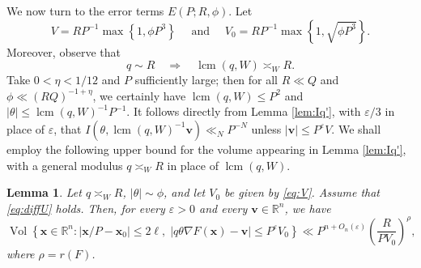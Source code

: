 \documentclass[a4paper,11pt, twoside,reqno]{amsart}
\theoremstyle{plain}
\newtheorem{lemma}[thm]{Lemma}
\theoremstyle{definition}
\theoremstyle{remark}
\newcommand{\bfv}{\bm{v}}
\newcommand{\bfx}{\bm{x}}
\newcommand{\RR}{\mathbb{R}}
\DeclareMathOperator{\meas}{Vol}
\newcommand{\ve}{\varepsilon}
\renewcommand{\le}{\leqslant}
\renewcommand{\leq}{\leqslant}
\newcommand{\lcm}{\operatorname{lcm}}
\numberwithin{equation}{section}
\begin{document}
We now turn to the error terms $E(P;R,\phi)$.
Let
\begin{equation}  
  \label{eq:V}
  V=RP^{-1} \max\left\{1,\phi P^3\right\}\quad \text{ and }\quad 
  V_0=RP^{-1} \max\left\{1,\sqrt{\phi P^3}\right\}.
  \end{equation}
  Moreover, observe that
$$q\sim R \quad \Longrightarrow \quad \lcm(q,W) \asymp_W R.$$
Take $0<\eta<1/12$ and $P$ sufficiently large; then
for all $R\ll Q$ and $\phi \ll (RQ)^{-1+\eta}$,
we certainly have $\lcm(q,W)\le P^2$ and $|\theta|\le \lcm(q,W)^{-1}P^{-1}$.
It follows directly from
Lemma \ref{lem:Iq'}, with $\ve/3$ in place of $\ve$, that 
$I(\theta,\lcm(q,W)^{-1}\bm{v})\ll_N P^{-N}$ unless 
$
|\bm{v}|\leq P^\ve V.
$
We shall employ the following upper bound for the volume appearing in 
Lemma \ref{lem:Iq'},
with a general modulus $q\asymp_W R$ in place of $\lcm(q,W)$.

\begin{lemma}\label{lem:gradient-volume}
Let $q\asymp_W R$, $|\theta|\sim \phi$, and let $V_0$ be given by \eqref{eq:V}.
Assume that \eqref{eq:diffU} holds.
Then, for every $\varepsilon>0$ and every
$\bfv\in \RR^n$, we have
\[
\meas\left\{
\bfx\in\RR^n:
|\bfx/P-\bm{x}_0|\le 2\ell,\;
|q\theta\nabla F(\bm{x})-\bm{v}|\leq P^\varepsilon V_0
\right\}
\ll
P^{n+O_n(\varepsilon)}\left(\frac{R}{PV_0}\right)^{\rho},
\]
where $\rho=r(F)$.
\end{lemma}
\end{document}
